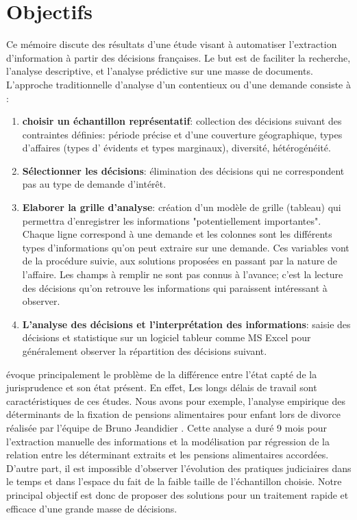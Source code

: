 \section{Objectifs}
 Ce mémoire discute des résultats d'une étude visant à automatiser l'extraction d'information à partir des décisions françaises. Le but est de faciliter la recherche, l'analyse descriptive, et l'analyse prédictive sur une masse de documents. L'approche traditionnelle d'analyse d'un contentieux ou d'une demande \citep{ancel2003expulsion} consiste à :
 \begin{enumerate}
 	\item \textbf{choisir un échantillon représentatif}: collection des décisions suivant des contraintes définies:  période précise et d'une couverture géographique, types d'affaires (types d' évidents et types marginaux), diversité, hétérogénéité. 
 	\item \textbf{Sélectionner les décisions}: élimination des décisions qui ne correspondent pas au type de demande d'intérêt.
 	\item \textbf{Elaborer la grille d'analyse}: création d'un modèle de grille (tableau) qui permettra d'enregistrer les informations "potentiellement importantes". Chaque ligne correspond à une demande et les colonnes sont les différents types d'informations qu'on peut extraire sur une demande. Ces variables vont de la procédure suivie, aux solutions proposées en passant par la nature de l'affaire. Les champs à remplir ne sont pas connus à l'avance; c'est la lecture des décisions qu'on retrouve les informations qui paraissent intéressant à observer.
 	\item \textbf{L'analyse des décisions et l'interprétation des informations}: saisie des décisions et statistique sur un logiciel tableur comme MS Excel pour généralement observer la répartition des décisions suivant.
 \end{enumerate}
 
\citet{ancel2003expulsion} évoque principalement le problème de la différence entre l'état capté de la jurisprudence et son état présent. En effet, Les longs délais de travail sont caractéristiques de ces études. Nous avons pour exemple, l'analyse empirique des déterminants de la fixation de pensions alimentaires pour enfant lors de divorce réalisée par l'équipe de Bruno Jeandidier \citep{jeandidier2006pensions}. Cette analyse a duré 9 mois pour l'extraction manuelle des informations et la modélisation par régression de la relation entre les déterminant extraits et les pensions alimentaires accordées.  D'autre part, il est impossible d'observer l'évolution des pratiques judiciaires dans le temps et dans l'espace du fait de la faible taille de l'échantillon choisie. Notre principal objectif est donc de proposer des solutions pour un traitement rapide et efficace d'une grande masse de décisions. 
 
